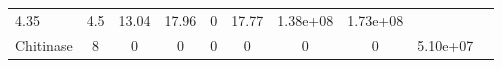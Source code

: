 \documentclass[]{article}
\begin{document}
\begin{longtable}[]{@{}lccccccccc@{}}
\begin{minipage}[t]{0.08\columnwidth}
4.35\strut
\end{minipage} & \begin{minipage}[t]{0.08\columnwidth}\centering\strut
4.5\strut
\end{minipage} & \begin{minipage}[t]{0.08\columnwidth}\centering\strut
13.04\strut
\end{minipage} & \begin{minipage}[t]{0.08\columnwidth}\centering\strut
17.96\strut
\end{minipage} & \begin{minipage}[t]{0.08\columnwidth}\centering\strut
0\strut
\end{minipage} & \begin{minipage}[t]{0.08\columnwidth}\centering\strut
17.77\strut
\end{minipage} & \begin{minipage}[t]{0.08\columnwidth}\centering\strut
1.38e+08\strut
\end{minipage} & \begin{minipage}[t]{0.08\columnwidth}\centering\strut
1.73e+08\strut
\end{minipage}\tabularnewline
\begin{minipage}[t]{0.07\columnwidth}\raggedright\strut
Chitinase\strut
\end{minipage} & \begin{minipage}[t]{0.06\columnwidth}\centering\strut
8\strut
\end{minipage} & \begin{minipage}[t]{0.08\columnwidth}\centering\strut
0\strut
\end{minipage} & \begin{minipage}[t]{0.08\columnwidth}\centering\strut
0\strut
\end{minipage} & \begin{minipage}[t]{0.08\columnwidth}\centering\strut
0\strut
\end{minipage} & \begin{minipage}[t]{0.08\columnwidth}\centering\strut
0\strut
\end{minipage} & \begin{minipage}[t]{0.08\columnwidth}\centering\strut
0\strut
\end{minipage} & \begin{minipage}[t]{0.08\columnwidth}\centering\strut
0\strut
\end{minipage} & \begin{minipage}[t]{0.08\columnwidth}\centering\strut
5.10e+07\strut

\end{minipage}
\end{longtable}
\end{document}
